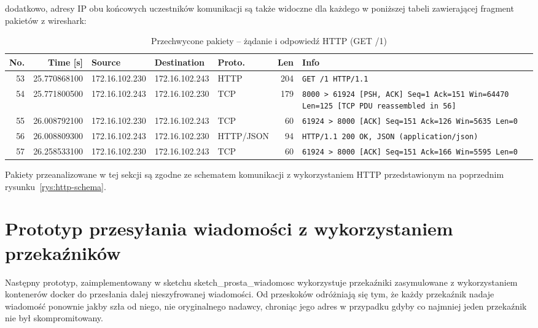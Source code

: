 \documentclass[thesis=inz,faculty=ee]{EE-dyplom}
\begin{document}
    dodatkowo, adresy IP obu końcowych uczestników komunikacji są także widoczne dla każdego w poniższej tabeli zawierającej fragment pakietów z wireshark:

    \begin{table}[htbp]
    \centering
    \caption{Przechwycone pakiety – żądanie i odpowiedź HTTP (GET /1)}
    \label{tab:pcap-http}
    \small
    \renewcommand{\arraystretch}{1.15}
    \begin{tabular}{@{} r r l l l r p{6.2cm} @{}}
    \toprule
    \textbf{No.} & \textbf{Time [s]} & \textbf{Source} & \textbf{Destination} & \textbf{Proto.} & \textbf{Len} & \textbf{Info} \\
    \midrule
    53 & 25.770868100 & 172.16.102.230 & 172.16.102.243 & HTTP & 204 & \texttt{GET /1 HTTP/1.1} \\
    54 & 25.771800500 & 172.16.102.243 & 172.16.102.230 & TCP  & 179 & \texttt{8000 > 61924 [PSH, ACK] Seq=1 Ack=151 Win=64470 Len=125 [TCP PDU reassembled in 56]} \\
    55 & 26.008792100 & 172.16.102.230 & 172.16.102.243 & TCP  & 60  & \texttt{61924 > 8000 [ACK] Seq=151 Ack=126 Win=5635 Len=0} \\
    56 & 26.008809300 & 172.16.102.243 & 172.16.102.230 & HTTP/JSON & 94 & \texttt{HTTP/1.1 200 OK, JSON (application/json)} \\
    57 & 26.258533100 & 172.16.102.230 & 172.16.102.243 & TCP  & 60  & \texttt{61924 > 8000 [ACK] Seq=151 Ack=166 Win=5595 Len=0} \\
    \bottomrule
    \end{tabular}
    \end{table}

    Pakiety przeanalizowane w tej sekcji są zgodne ze schematem komunikacji z wykorzystaniem HTTP przedstawionym na poprzednim rysunku~\ref{rys:http-schema}. 

    \section{Prototyp przesyłania wiadomości z wykorzystaniem przekaźników}

    Następny prototyp, zaimplementowany w sketchu sketch\_prosta\_wiadomosc wykorzystuje przekaźniki zasymulowane z wykorzystaniem kontenerów docker do przesłania dalej
    nieszyfrowanej wiadomości. Od przeskoków odróżniają się tym, że każdy przekaźnik nadaje wiadomość ponownie jakby szła od niego, nie oryginalnego nadawcy, chroniąc
    jego adres w przypadku gdyby co najmniej jeden przekaźnik nie był skompromitowany.
\end{document}
